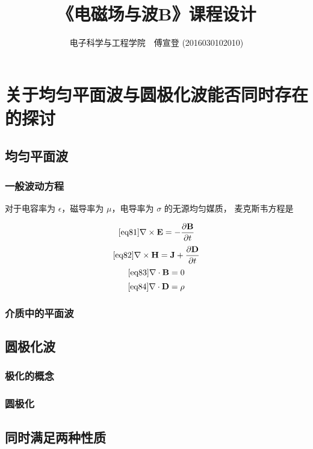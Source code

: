 \documentclass[UTF8,linespread=1.236]{ctexart}
\newcommand\pypx[2]{{{\partial {#1}} \over {\partial {#2}}}}
\begin{document}
\title{《电磁场与波B》课程设计}
\author{电子科学与工程学院\ \ 傅宣登 (2016030102010)}

\maketitle

\section{关于均匀平面波与圆极化波能否同时存在的探讨}

\subsection{均匀平面波}

\subsubsection{一般波动方程}

对于电容率为 $\epsilon$，磁导率为 $\mu$，电导率为 $\sigma$
的无源均匀媒质，
麦克斯韦方程是

\begin{equation}\ref{eq81}
    \nabla \times \mathbf{E} = - \pypx{\mathbf{B}}{t}
\end{equation}
\begin{equation}
    \ref{eq82}
    \nabla \times \mathbf{H} = \mathbf{J} + \pypx{\mathbf{D}}{t}
\end{equation}
\begin{equation}
    \ref{eq83}
    \nabla \cdot \mathbf{B} = 0
\end{equation}
\begin{equation}
    \ref{eq84}
    \nabla \cdot \mathbf{D} = \rho
\end{equation}

\subsubsection{介质中的平面波}

\subsection{圆极化波}

\subsubsection{极化的概念}

\subsubsection{圆极化}

\subsection{同时满足两种性质}


\end{document}
